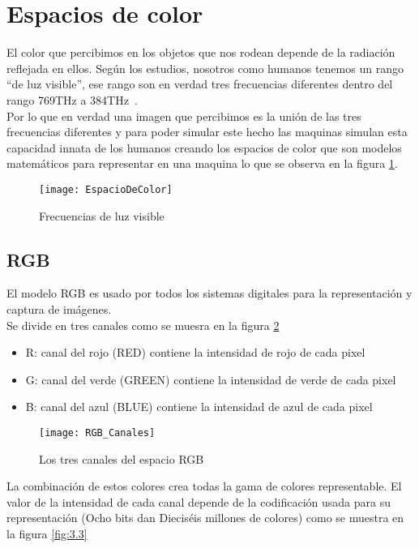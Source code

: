 
\section{Espacios de color }
El color que percibimos en los objetos que nos rodean depende de la radiación reflejada en ellos. Según los estudios, nosotros como humanos tenemos un rango ``de luz visible'', ese rango son en verdad tres frecuencias diferentes dentro del rango 769THz a 384THz~\cite{Manual:HAE}.\\
Por lo que en verdad una imagen que percibimos es la unión de las tres frecuencias diferentes y para poder simular este hecho las maquinas simulan esta capacidad innata de los humanos creando los espacios de color que son modelos matemáticos para representar en una maquina lo que se observa en la figura \ref{fig:3.1}.

\begin{figure}[h]
\centering
\texttt{[image: EspacioDeColor]}
\caption{Frecuencias de luz visible \cite{Manual:HAE}}
\label{fig:3.1}
\end{figure}

\subsection{RGB}
El modelo RGB es usado por todos los sistemas digitales para la representación y captura de imágenes.\\
Se divide en tres canales como se muesra en la figura \ref{fig:3.2}\\
\begin{itemize}
	\item R: canal del rojo (RED) contiene la intensidad de rojo de cada pixel\\
	\item G: canal del verde (GREEN) contiene la intensidad de verde de cada pixel\\
	\item B: canal del azul (BLUE) contiene la intensidad de azul de cada pixel\\ 
\end{itemize}

\begin{figure}[h]
\centering
\texttt{[image: RGB\_Canales]}
\caption{Los tres canales del espacio RGB \cite{Manual:HAE}}
\label{fig:3.2}
\end{figure}
La combinación de estos colores crea todas la gama de colores representable.
El valor de la intensidad de cada canal depende de la codificación usada para su representación (Ocho bits dan Dieciséis millones de colores) como se muestra en la figura  \ref{fig:3.3}

